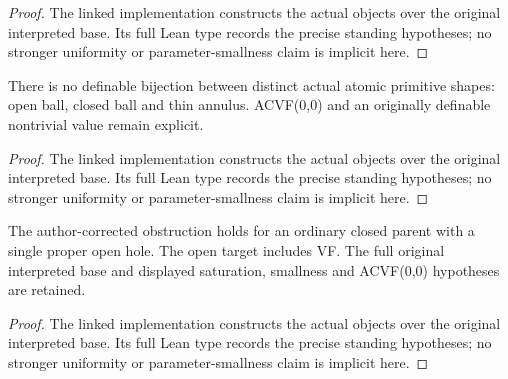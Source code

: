 \begin{proof}


\leanok

The linked implementation constructs the actual objects over the original interpreted base. Its full Lean type records the precise standing hypotheses; no stronger uniformity or parameter-smallness claim is implicit here.

\end{proof}

\begin{proposition}

\label{s3-23}


\leanok

There is no definable bijection between distinct actual atomic primitive shapes: open ball, closed ball and thin annulus. ACVF(0,0) and an originally definable nontrivial value remain explicit.

\end{proposition}

\begin{proof}


\leanok

The linked implementation constructs the actual objects over the original interpreted base. Its full Lean type records the precise standing hypotheses; no stronger uniformity or parameter-smallness claim is implicit here.

\end{proof}

\begin{proposition}

\label{s3-24}


\leanok

The author-corrected obstruction holds for an ordinary closed parent with a single proper open hole. The open target includes VF. The full original interpreted base and displayed saturation, smallness and ACVF(0,0) hypotheses are retained.

\end{proposition}

\begin{proof}


\leanok

The linked implementation constructs the actual objects over the original interpreted base. Its full Lean type records the precise standing hypotheses; no stronger uniformity or parameter-smallness claim is implicit here.

\end{proof}

